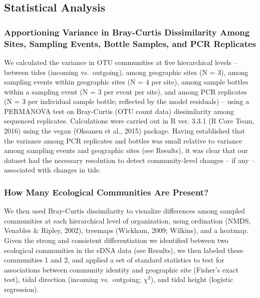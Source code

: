 \documentclass[fleqn,10pt,lineno]{wlpeerj} %
\begin{document}
\subsection{Statistical Analysis}\label{statistical-analysis}

\subsubsection{Apportioning Variance in Bray-Curtis Dissimilarity Among
Sites, Sampling Events, Bottle Samples, and PCR
Replicates}\label{apportioning-variance-in-bray-curtis-dissimilarity-among-sites-sampling-events-bottle-samples-and-pcr-replicates}

We calculated the variance in OTU communities at five hierarchical
levels -- between tides (incoming vs.~outgoing), among geographic sites
(N = 3), among sampling events within geographic sites (N = 4 per site),
among sample bottles within a sampling event (N = 3 per event per site),
and among PCR replicates (N = 3 per individual sample bottle; reflected
by the model residuals) -- using a PERMANOVA test on Bray-Curtis (OTU
count data) dissimilarity among sequenced replicates. Calculations were
carried out in R ver. 3.3.1 (R Core Team, 2016) using the vegan (Oksanen
et al., 2015) package. Having established that the variance among PCR
replicates and bottles was small relative to variance among sampling
events and geographic sites (see Results), it was clear that our dataset
had the necessary resolution to detect community-level changes -- if any
-- associated with changes in tide.

\subsubsection{How Many Ecological Communities Are
Present?}\label{how-many-ecological-communities-are-present}

We then used Bray-Curtis dissimilarity to visualize differences among
sampled communities at each hierarchical level of organization, using
ordination (NMDS, Venables \& Ripley, 2002), treemaps (Wickham, 2009;
Wilkins), and a heatmap. Given the strong and consistent differentiation
we identified between two ecological communities in the eDNA data (see
Results), we then labeled these communities 1 and 2, and applied a set
of standard statistics to test for associations between community
identity and geographic site (Fisher's exact test), tidal direction
(incoming vs.~outgoing; \(\chi^2\)), and tidal height (logistic
regression).
\end{document}
